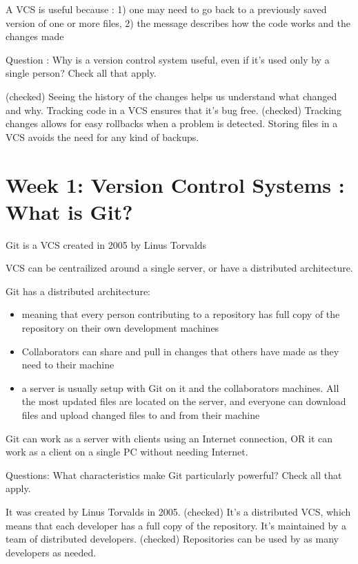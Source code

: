 \documentclass[11pt, onecolumn]{article}
\begin{document}
A VCS is useful because :  1) one may need to go back to a previously saved version of one or more files, 2) the message describes how the code works and the changes made


Question : Why is a version control system useful, even if it's used only by a single person? Check all that apply.

(checked) Seeing the history of the changes helps us understand what changed and why.
Tracking code in a VCS ensures that it's bug free.
(checked) Tracking changes allows for easy rollbacks when a problem is detected.
Storing files in a VCS avoids the need for any kind of backups.


\section{Week 1: Version Control Systems : What is Git?}

Git is a VCS created in 2005 by Linus Torvalds

VCS can be centrailized around a single server, or have a distributed architecture.

Git has a distributed architecture:
\begin{itemize}
\item meaning that every person contributing to a repository has full copy of the repository on their own development machines 
\item Collaborators can share and pull in changes that others have made as they need to their machine
\item a server is usually setup with Git on it and the collaborators machines. All the most updated files are located on the server, and everyone can download files and upload changed files to and from their machine
\end{itemize}

Git can work as a server with clients using an Internet connection, OR it can work as a client on a single PC without needing Internet. 

Questions: What characteristics make Git particularly powerful? Check all that apply.

It was created by Linus Torvalds in 2005.
(checked) It's a distributed VCS, which means that each developer has a full copy of the repository.
It's maintained by a team of distributed developers.
(checked) Repositories can be used by as many developers as needed.
\end{document}
